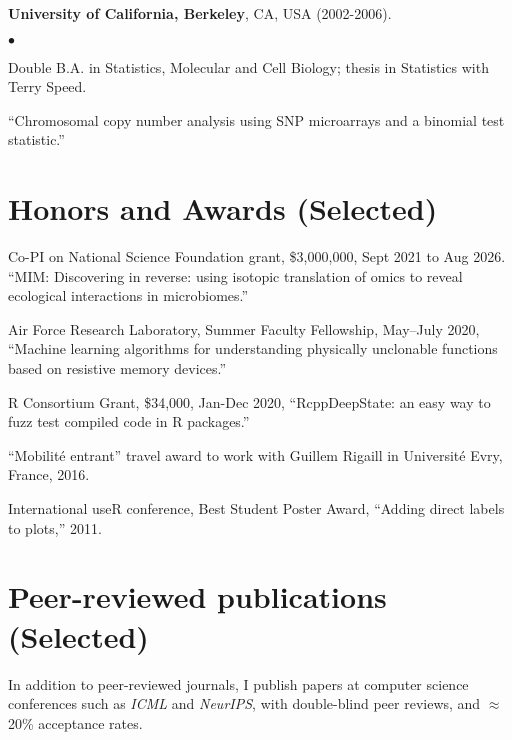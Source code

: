 \documentclass[margin,line]{res}
\newenvironment{list2}{
  \begin{list}{$\bullet$}{%
      \setlength{\itemsep}{0in}
      \setlength{\parsep}{0in} \setlength{\parskip}{0in}
      \setlength{\topsep}{0in} \setlength{\partopsep}{0in} 
      \setlength{\leftmargin}{0.2in}}}{\end{list}}
\begin{document}
\begin{resume}
{\bf University of California, Berkeley}, CA, USA (2002-2006).\\
\vspace*{-.1in}
\begin{list2}
\item[] Double B.A. in Statistics, Molecular and Cell Biology; thesis in Statistics with Terry Speed.
\item[] ``Chromosomal copy number analysis using SNP microarrays and a binomial test statistic.'' 
\end{list2}

\section{\sc Honors and Awards (Selected)}

Co-PI on National Science Foundation grant, \$3,000,000, Sept 2021 to
Aug 2026. ``MIM: Discovering in reverse: using isotopic translation
of omics to reveal ecological interactions in microbiomes.''

Air Force Research Laboratory, Summer Faculty Fellowship, May--July
2020, ``Machine learning algorithms for understanding physically
unclonable functions based on resistive memory devices.''

R Consortium Grant, \$34,000, Jan-Dec 2020, ``RcppDeepState: an easy
way to fuzz test compiled code in R packages.''

``Mobilit\'e entrant'' travel award to work with Guillem Rigaill in
Universit\'e Evry, France, 2016.

International useR conference, Best Student Poster Award, ``Adding
direct labels to plots,'' 2011.




\section{\sc Peer-reviewed publications (Selected)}

In addition to peer-reviewed journals, I publish papers at
computer science conferences such as {\it ICML} and {\it NeurIPS}, with
double-blind peer reviews, and $\approx$20\% acceptance rates.


\end{resume}
\end{document}
